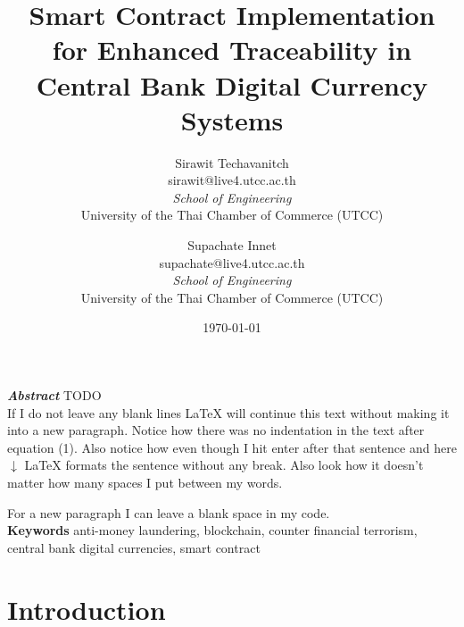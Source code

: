 \documentclass[letterpaper,twocolumn,10pt]{article} %
\title{\textbf{Smart Contract Implementation for Enhanced Traceability in Central Bank Digital Currency Systems}} %
\author{
    Sirawit Techavanitch \\ sirawit@live4.utcc.ac.th \\ \textit{School of Engineering} \\ University of the Thai Chamber of Commerce (UTCC) \and 
    Supachate Innet \\ supachate@live4.utcc.ac.th \\ \textit{School of Engineering} \\ University of the Thai Chamber of Commerce (UTCC) } %
\date{\today} %
\begin{document}
    \maketitle %
    
    \textbf{\textit{Abstract}} TODO 
    \begin{equation} %
    \end{equation}
    If I do not leave any blank lines \LaTeX{} will continue  this text without making it into a new paragraph.  Notice how there was no indentation in the text after equation (1).  
    Also notice how even though I hit enter after that sentence and here $\downarrow$
     \LaTeX{} formats the sentence without any break.  Also   look  how      it   doesn't     matter          how    many  spaces     I put     between       my    words.
    
    For a new paragraph I can leave a blank space in my code.\\
    \textbf{Keywords} anti-money laundering, blockchain, counter financial terrorism, central bank digital currencies, smart contract
    \section{Introduction}
\end{document}
